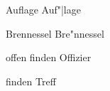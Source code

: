\documentclass{article}
\begin{document}




Auflage Auf"|lage

Brennessel Bre"nnessel

offen finden Offizier

finden Treff


\end{document}
